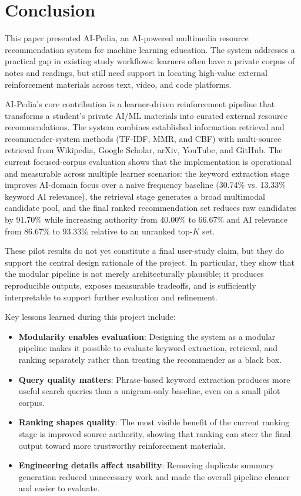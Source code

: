\documentclass[10pt,journal,compsoc]{IEEEtran}
\begin{document}
\section{Conclusion}
This paper presented AI-Pedia, an AI-powered multimedia resource recommendation system for machine learning education. The system addresses a practical gap in existing study workflows: learners often have a private corpus of notes and readings, but still need support in locating high-value external reinforcement materials across text, video, and code platforms.

AI-Pedia's core contribution is a learner-driven reinforcement pipeline that transforms a student's private AI/ML materials into curated external resource recommendations. The system combines established information retrieval and recommender-system methods (TF-IDF, MMR, and CBF) with multi-source retrieval from Wikipedia, Google Scholar, arXiv, YouTube, and GitHub. The current focused-corpus evaluation shows that the implementation is operational and measurable across multiple learner scenarios: the keyword extraction stage improves AI-domain focus over a naive frequency baseline (30.74\% vs. 13.33\% keyword AI relevance), the retrieval stage generates a broad multimodal candidate pool, and the final ranked recommendation set reduces raw candidates by 91.70\% while increasing authority from 40.00\% to 66.67\% and AI relevance from 86.67\% to 93.33\% relative to an unranked top-$K$ set.

These pilot results do not yet constitute a final user-study claim, but they do support the central design rationale of the project. In particular, they show that the modular pipeline is not merely architecturally plausible; it produces reproducible outputs, exposes measurable tradeoffs, and is sufficiently interpretable to support further evaluation and refinement.

Key lessons learned during this project include:
\begin{itemize}
\item \textbf{Modularity enables evaluation}: Designing the system as a modular pipeline makes it possible to evaluate keyword extraction, retrieval, and ranking separately rather than treating the recommender as a black box.
\item \textbf{Query quality matters}: Phrase-based keyword extraction produces more useful search queries than a unigram-only baseline, even on a small pilot corpus.
\item \textbf{Ranking shapes quality}: The most visible benefit of the current ranking stage is improved source authority, showing that ranking can steer the final output toward more trustworthy reinforcement materials.
\item \textbf{Engineering details affect usability}: Removing duplicate summary generation reduced unnecessary work and made the overall pipeline cleaner and easier to evaluate.
\end{itemize}
\end{document}
